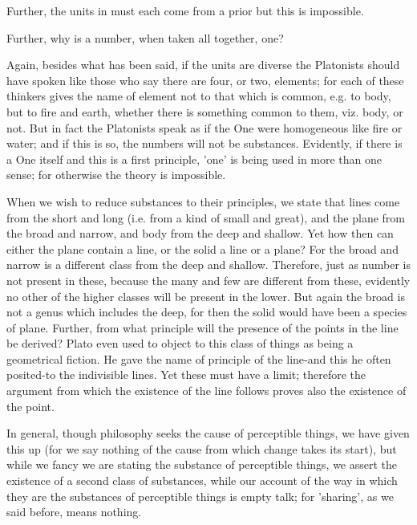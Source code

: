 \documentclass[oneside, 17pt, dvipsnames]{extbook}
\begin{document}
Further, the units in must each come from a prior but this is impossible.

Further, why is a number, when taken all together, one?

Again, besides what has been said, if the units are diverse the Platonists should have spoken like those who say there are four, or two, elements; for each of these thinkers gives the name of element not to that which is common, e.g. to body, but to fire and earth, whether there is something common to them, viz. body, or not. But in fact the Platonists speak as if the One were homogeneous like fire or water; and if this is so, the numbers will not be substances. Evidently, if there is a One itself and this is a first principle, 'one' is being used in more than one sense; for otherwise the theory is impossible.

When we wish to reduce substances to their principles, we state that lines come from the short and long (i.e. from a kind of small and great), and the plane from the broad and narrow, and body from the deep and shallow. Yet how then can either the plane contain a line, or the solid a line or a plane? For the broad and narrow is a different class from the deep and shallow. Therefore, just as number is not present in these, because the many and few are different from these, evidently no other of the higher classes will be present in the lower. But again the broad is not a genus which includes the deep, for then the solid would have been a species of plane. Further, from what principle will the presence of the points in the line be derived? Plato even used to object to this class of things as being a geometrical fiction. He gave the name of principle of the line-and this he often posited-to the indivisible lines. Yet these must have a limit; therefore the argument from which the existence of the line follows proves also the existence of the point.

In general, though philosophy seeks the cause of perceptible things, we have given this up (for we say nothing of the cause from which change takes its start), but while we fancy we are stating the substance of perceptible things, we assert the existence of a second class of substances, while our account of the way in which they are the substances of perceptible things is empty talk; for 'sharing', as we said before, means nothing.
\end{document}
